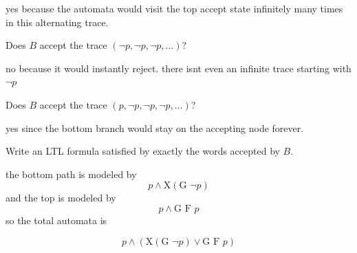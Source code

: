 \documentclass[11pt]{article}
\begin{document}
\begin{qunlist}
\begin{qparts}
    \begin{answer}
      yes because the automata would visit the top accept state infinitely many times in this alternating trace.
    \end{answer}

  \item
    Does $B$ accept the trace $(\lnot p, \lnot p, \lnot p, \dots)$?

    \begin{answer}
      no because it would instantly reject. there isnt even an infinite trace starting with \(\neg p\)
    \end{answer}

  \item
    Does $B$ accept the trace $(p, \lnot p, \lnot p, \lnot p, \dots)$?

    \begin{answer}
      yes since the bottom branch would stay on the accepting node forever.

    \end{answer}

  \item
    Write an LTL formula satisfied by exactly the words accepted by $B$.

    \begin{answer}
      the bottom path is modeled by $$p \land \text{X}(\text{G } \lnot p)$$ and the top is modeled by $$p \land \text{G F } p$$ so the total automata is

      $$p \land (\text{X}(\text{G } \lnot p) \lor \text{G F } p)$$


    \end{answer}
  \end{qparts}

\end{qunlist}
\end{document}
